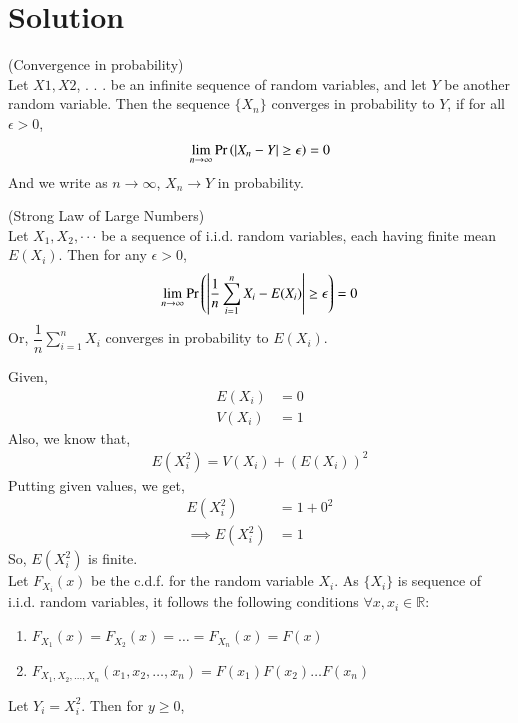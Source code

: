 \documentclass[journal,12pt,twocolumn]{IEEEtran}
\begin{document}
\section{Solution}
\begin{definition}
    (Convergence in probability)\\
    Let $X1, X2$, . . . be an infinite sequence of random variables, and let $Y$ be another random variable. Then the sequence $\{X_n\}$ converges in probability to $Y$, if for all $\epsilon >0$, 
    \begin{align}
        \lim_{n \to \infty}\Pr\left(|X_n-Y|\geq \epsilon\right)=0
    \end{align}
And we write as $n \to \infty$, $X_n \to Y$ in probability.
\end{definition}
\begin{theorem}
    (Strong Law of Large Numbers)\\
    Let $X_1, X_2, \cdot \cdot \cdot$ be a sequence of i.i.d. random variables, each having finite mean $E(X_i)$. Then for any $\epsilon >0$,
    \begin{align}
        \lim_{n \to \infty}\Pr\left(\left|\dfrac{1}{n}\sum_{i=1}^nX_i - E(X_i)\right|\geq \epsilon\right)=0
    \end{align}
    Or, $\dfrac{1}{n}\sum_{i=1}^nX_i$ converges in probability to $E(X_i)$.
\end{theorem}
Given,
\begin{align} 
    E(X_i)&=0 
    \label{a}\\
    V(X_i)&=1
    \label{b}
\end{align}
Also, we know that,
\begin{align}
    E(X_i^2)=V(X_i)+(E(X_i))^2
\end{align}
Putting given values, we get,
\begin{align} \label{c}
    E(X_i^2)&=1+0^2\\
    \implies E(X_i^2)&=1
\end{align}
So, $E(X_i^2)$ is finite.\\
Let $F_{X_i}(x)$ be the c.d.f. for the random variable $X_i$.
As $\{X_i\}$ is sequence of i.i.d. random variables, it follows the following conditions $\forall x,x_i \in \mathbb{R}$:
\begin{enumerate}
    \item $F_{X_1}(x)=F_{X_2}(x)=\dots=F_{X_n}(x)=F(x) $
    \item $F_{X_1,X_2,\dots,X_n}(x_1,x_2,\dots,x_n)=F(x_1)F(x_2) \dots F(x_n)$
\end{enumerate}
Let $Y_i=X_i^2$. Then for $y \geq 0$,
\end{document}

